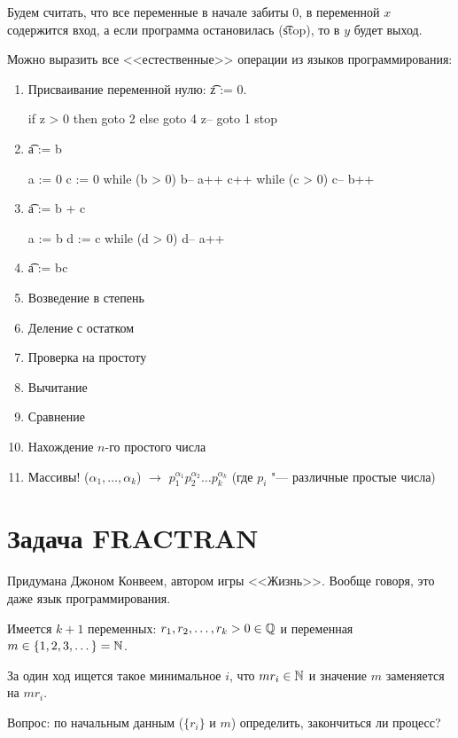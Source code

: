 Будем считать, что все переменные в начале забиты 0, в переменной $x$ содержится вход, а если программа остановилась (\t{stop}), то
в $y$ будет выход.

\begin{exmp}
	Можно выразить все <<естественные>> операции из языков программирования:
	\begin{enumerate}
		\item Присваивание переменной нулю: \t{z := 0}.
		\begin{abstractcode}
if z > 0 then goto 2 else goto 4
z--
goto 1
stop    \end{abstractcode}
		\item \t{a := b}
		\begin{abstractcode}
a := 0
c := 0
while (b > 0)
	b--
	a++
	c++
while (c > 0)
	c--
	b++ \end{abstractcode}
	\item \t{a := b + c}
	\begin{abstractcode}
a := b
d := c
while (d > 0)
	d--
	a++ 
	\end{abstractcode}
	\item \t{a := bc}
	\item Возведение в степень
	\item Деление с остатком
	\item Проверка на простоту
	\item Вычитание
	\item Сравнение
	\item Нахождение $n$-го простого числа
	\item Массивы! ($\alpha_1, \dots, \alpha_k$) $\rightarrow$ $p_1^{\alpha_1}p_2^{\alpha_2}\dots p_k^{\alpha_k}$ (где $p_i$ "--- различные простые числа)
	\end{enumerate}
\end{exmp} 


\section{Задача FRACTRAN}
Придумана Джоном Конвеем, автором игры <<Жизнь>>.
Вообще говоря, это даже язык программирования.

Имеется $k+1$ переменных: $r_1, r_2, \dots, r_k > 0 \in \mathbb{Q}$ и переменная $m \in \{1, 2, 3, \dots\} = \mathbb{N}$.

За один ход ищется такое минимальное $i$, что $mr_i \in \mathbb{N}$ и значение $m$ заменяется на $mr_i$.

Вопрос: по начальным данным ($\{r_i\}$ и $m$) определить, закончиться ли процесс?

